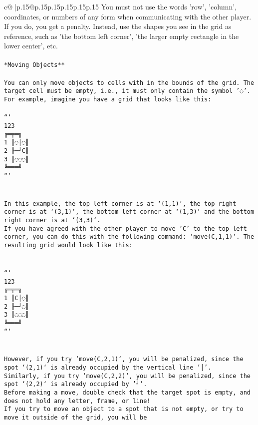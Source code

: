 \documentclass{article}
\begin{document}
{\begin{supertabular}{c@{$\;$}|p{.15\linewidth}@{}p{.15\linewidth}p{.15\linewidth}p{.15\linewidth}p{.15\linewidth}p{.15\linewidth}}
{{{You must not use the words 'row', 'column', coordinates, or numbers of any form when communicating with the other player. If you do, you get a penalty. Instead, use the shapes you see in the grid as reference, such as 'the bottom left corner', 'the larger empty rectangle in the lower center', etc.\\ \tt \\ \tt **Moving Objects**\\ \tt \\ \tt * You can only move objects to cells with in the bounds of the grid. The target cell must be empty, i.e., it must only contain the symbol '◌'.\\ \tt * For example, imagine you have a grid that looks like this: \\ \tt \\ \tt ```\\ \tt     123\\ \tt    ╔═╤═╗\\ \tt  1 ║◌│◌║\\ \tt  2 ╟─┘C║\\ \tt  3 ║◌◌◌║\\ \tt    ╚═══╝\\ \tt ```\\ \tt \\ \tt \\ \tt * In this example, the top left corner is at `(1,1)`, the top right corner is at `(3,1)`, the bottom left corner at `(1,3)` and the bottom right corner is at `(3,3)`.\\ \tt * If you have agreed with the other player to move 'C' to the top left corner, you can do this with the following command: `move(C,1,1)`. The resulting grid would look like this: \\ \tt \\ \tt \\ \tt ```\\ \tt     123\\ \tt    ╔═╤═╗\\ \tt  1 ║C│◌║\\ \tt  2 ╟─┘◌║\\ \tt  3 ║◌◌◌║\\ \tt    ╚═══╝\\ \tt ```\\ \tt \\ \tt \\ \tt * However, if you try `move(C,2,1)`, you will be penalized, since the spot `(2,1)` is already occupied by the vertical line '│'.\\ \tt * Similarly, if you try `move(C,2,2)`, you will be penalized, since the spot `(2,2)` is already occupied by '┘'.\\ \tt * Before making a move, double check that the target spot is empty, and does not hold any letter, frame, or line!\\ \tt * If you try to move an object to a spot that is not empty, or try to move it outside of the grid, you will be }}}
\end{supertabular}}
\end{document}
